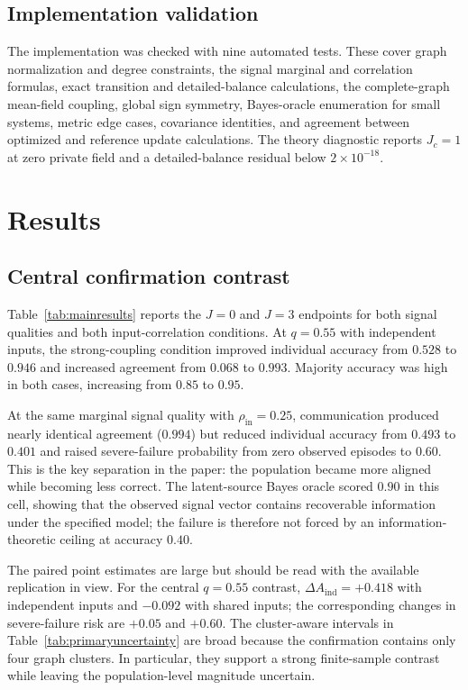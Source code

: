 \documentclass[11pt,a4paper]{article}
\begin{document}
\subsection{Implementation validation}

The implementation was checked with nine automated tests. These cover graph normalization and degree constraints, the signal marginal and correlation formulas, exact transition and detailed-balance calculations, the complete-graph mean-field coupling, global sign symmetry, Bayes-oracle enumeration for small systems, metric edge cases, covariance identities, and agreement between optimized and reference update calculations. The theory diagnostic reports $J_c=1$ at zero private field and a detailed-balance residual below $2\times10^{-18}$.

\section{Results}

\subsection{Central confirmation contrast}

Table~\ref{tab:mainresults} reports the $J=0$ and $J=3$ endpoints for both signal qualities and both input-correlation conditions. At $q=0.55$ with independent inputs, the strong-coupling condition improved individual accuracy from $0.528$ to $0.946$ and increased agreement from $0.068$ to $0.993$. Majority accuracy was high in both cases, increasing from $0.85$ to $0.95$.

At the same marginal signal quality with $\rho_{\mathrm{in}}=0.25$, communication produced nearly identical agreement ($0.994$) but reduced individual accuracy from $0.493$ to $0.401$ and raised severe-failure probability from zero observed episodes to $0.60$. This is the key separation in the paper: the population became more aligned while becoming less correct. The latent-source Bayes oracle scored $0.90$ in this cell, showing that the observed signal vector contains recoverable information under the specified model; the failure is therefore not forced by an information-theoretic ceiling at accuracy $0.40$.

The paired point estimates are large but should be read with the available replication in view. For the central $q=0.55$ contrast, $\Delta A_{\mathrm{ind}}=+0.418$ with independent inputs and $-0.092$ with shared inputs; the corresponding changes in severe-failure risk are $+0.05$ and $+0.60$. The cluster-aware intervals in Table~\ref{tab:primaryuncertainty} are broad because the confirmation contains only four graph clusters. In particular, they support a strong finite-sample contrast while leaving the population-level magnitude uncertain.
\end{document}
